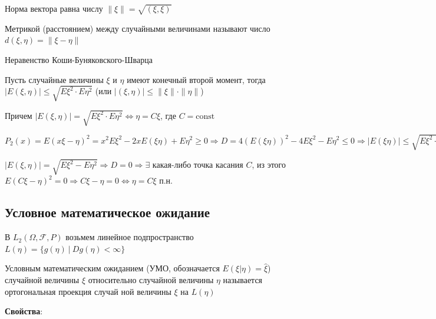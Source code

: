 \documentclass[12pt]{article}
\begin{document}
\Def Норма вектора равна числу $\|\xi\| = \sqrt{(\xi, \xi)}$

\Def Метрикой (расстоянием) между случайными величинами называют число $d(\xi, \eta) = \|\xi - \eta\|$

\hypertarget{cauchybunyakovskyschwarzinequality}{}

\begin{MyTheorem}
    \Ths Неравенство Коши-Буняковского-Шварца

    Пусть случайные величины $\xi$ и $\eta$ имеют конечный второй момент, тогда 
    $|E(\xi, \eta)| \leq \sqrt{E\xi^2 \cdot E\eta^2}$ (или $|(\xi, \eta)| \leq \|\xi\|\cdot\|\eta\|$)

    Причем $|E(\xi, \eta)| = \sqrt{E\xi^2 \cdot E\eta^2} \Longleftrightarrow \eta = C\xi$, где $C = \mathrm{const}$
\end{MyTheorem}

\begin{MyProof}
    $P_2(x) = E(x\xi - \eta)^2 = x^2 E\xi^2 - 2xE(\xi\eta) + E\eta^2 \geq 0 \Longrightarrow D = 4(E(\xi\eta))^2 - 
    4 E\xi^2 - E\eta^2 \leq 0 \Longrightarrow |E(\xi\eta)| \leq \sqrt{E\xi^2 \cdot E\eta^2}$
    
    $|E(\xi, \eta)| = \sqrt{E\xi^2 - E\eta^2} \Longrightarrow D = 0 \Longrightarrow \exists$ какая-либо точка касания $C$, 
    из этого $E(C\xi - \eta)^2 = 0 \Longrightarrow C\xi - \eta = 0 \Longleftrightarrow \eta = C\xi \text{ п.н. }$
\end{MyProof}

\subsection{Условное математическое ожидание}

\hypertarget{conditionalexpectedvalue}{}

В $L_2(\Omega, \mathcal{F}, P)$ возьмем линейное подпространство $L(\eta) = \{g(\eta) \ | \ Dg(\eta) < \infty\}$

 Условным математическим ожиданием (УМО, обозначается $E(\xi|\eta) = \hat{\xi}$) случайной величины $\xi$
относительно случайной величины $\eta$ называется ортогональная проекция случай
ной величины $\xi$ на $L(\eta)$ 

\mediumvspace

\hypertarget{conditionalexpectedvalueproperties}{}

\textbf{Свойства}:
\end{document}

